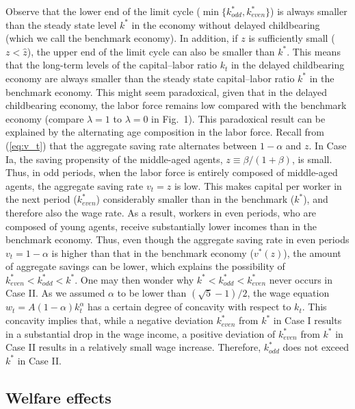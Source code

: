 \documentclass{MBE}%
\begin{document}
{Observe that the lower end of the limit cycle ($\min\{k_{odd}^{\ast}%
,k_{even}^{\ast}\}$) is always smaller than the steady state level $k^{\ast}$ in the economy
without delayed childbearing (which we call the benchmark economy). In addition, if $z$ is
sufficiently small ($z<\widehat z$), the upper end of the limit cycle can also be smaller than
$k^{\ast}$. This means that the long-term levels of the capital--labor ratio $k_{t}$ in the
delayed childbearing economy are always smaller than the steady state capital--labor ratio $k^{*}$
in the benchmark economy. This might seem paradoxical, given that in the delayed childbearing
economy, the labor force remains low compared with the benchmark economy (compare $\lambda=1$ to
$\lambda=0$ in Fig.~1). This paradoxical result can be explained by the alternating age
composition in the labor force. Recall from (\ref{eq:v_t}) that the aggregate saving rate
alternates between $1-\alpha$ and $z$. In Case Ia, the saving propensity of the middle-aged
agents, $z\equiv\beta/(1+\beta)$, is small. Thus, in odd periods, when the labor force is entirely
composed of middle-aged agents, the aggregate saving rate $v_{t}=z$ is low. This makes capital per
worker in the next period ($k^{*}_{even}$) considerably smaller than in the benchmark ($k^{*}$),
and therefore also the wage rate. As a result, workers in even periods, who are composed of young
agents, receive substantially lower incomes than in the benchmark economy. Thus, even though the
aggregate saving rate in even periods $v_{t}=1-\alpha$ is higher than that in the benchmark
economy ($v^{*}(z)$), the amount of aggregate savings can be
lower, which explains the possibility of $k^{*}_{even}<k^{*}_{odd}<k^{*}%
$. {One may then wonder why $k^{\ast}<k_{odd}^{\ast}<k_{even}^{\ast}$ never occurs in Case II. As
we assumed $\alpha$ to be lower than $\left( \sqrt{5}-1\right)  /2$, the wage equation
$w_{t}=A(1-\alpha)k_{t}^{\alpha}$ has a certain degree of concavity with respect to $k_{t}$. This
concavity implies that, while a negative deviation $k^{*}_{even}$ from $k^{\ast}$ in Case I
results in a substantial drop in the wage income, a positive deviation of $k^{*}_{even}$ from
$k^{\ast}$ in Case II results in a relatively small wage increase. Therefore, $k_{odd}^{\ast}$
does not exceed $k^{\ast}$ in Case II. \label{foot:K_Flu_Effect}}

\subsection{Welfare effects\label{sec:Welfare}}

}
\end{document}
